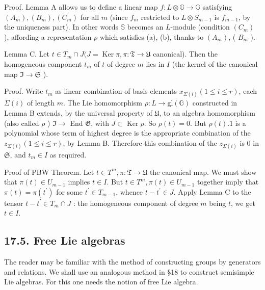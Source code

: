 \documentclass[10pt]{article}
\begin{document}
Proof. Lemma A allows us to define a linear map $f: L \otimes \mathbb{G} \rightarrow \mathbb{G}$ satisfying $\left(A_{m}\right),\left(B_{m}\right),\left(C_{m}\right)$ for all $m$ (since $f_{m}$ restricted to $L \otimes S_{m-1}$ is $f_{m-1}$, by the uniqueness part). In other words $\mathbb{S}$ becomes an $L$-module (condition $\left(C_{m}\right)$ ), affording a representation $\rho$ which satisfies (a), (b), thanks to $\left(A_{m}\right)$, ( $B_{m}$ ).

Lemma C. Let $t \in T_{m} \cap J(J=\operatorname{Ker} \pi, \pi: \mathfrak{T} \rightarrow \mathfrak{U}$ canonical). Then the homogeneous component $t_{m}$ of $t$ of degree $m$ lies in $I$ (the kernel of the canonical map $\mathfrak{I} \rightarrow \mathfrak{S}$ ).

Proof. Write $t_{m}$ as linear combination of basis elements $x_{\Sigma(i)}(1 \leq i \leq r)$, each $\Sigma(i)$ of length $m$. The Lie homomorphism $\rho: L \rightarrow \mathrm{gl}(\mathbb{G})$ constructed in Lemma B extends, by the universal property of $\mathfrak{U}$, to an algebra homomorphism (also called $\rho$ ) $\mathfrak{I} \rightarrow$ End $\mathfrak{G}$, with $J \subset \operatorname{Ker} \rho$. So $\rho(t)=0$. But $\rho(t) .1$ is a polynomial whose term of highest degree is the appropriate combination of the $z_{\Sigma(i)}(1 \leq i \leq r)$, by Lemma B. Therefore this combination of the $z_{\Sigma(i)}$ is 0 in $\mathfrak{S}$, and $t_{m} \in I$ as required.

Proof of PBW Theorem. Let $t \in T^{m}, \pi: \mathfrak{T} \rightarrow \mathfrak{U}$ the canonical map. We must show that $\pi(t) \in U_{m-1}$ implies $t \in I$. But $t \in T^{m}, \pi(t) \in U_{m-1}$ together imply that $\pi(t)=\pi\left(t^{\prime}\right)$ for some $t^{\prime} \in T_{m-1}$, whence $t-t^{\prime} \in J$. Apply Lemma C to the tensor $t-t^{\prime} \in T_{m} \cap J$ : the homogeneous component of degree $m$ being $t$, we get $t \in I$.

\subsection*{17.5. Free Lie algebras}
The reader may be familiar with the method of constructing groups by generators and relations. We shall use an analogous method in §18 to construct semisimple Lie algebras. For this one needs the notion of free Lie algebra.
\end{document}
